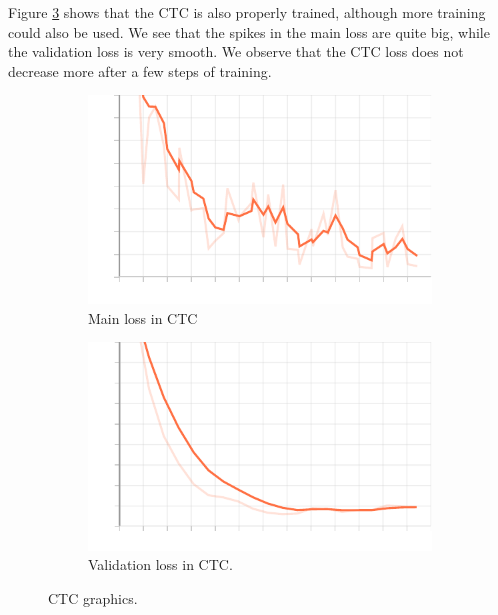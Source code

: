 \documentclass[a4paper]{article}
\begin{document}
\begin{itemize}
        Figure \ref{fig:ctc} shows that the CTC is also properly trained, although more training could also be used. We see that the spikes in the main loss are quite big, while the validation loss is very smooth. We observe that the CTC loss does not decrease more after a few steps of training.

        \begin{figure}[H]
          \centering
          \begin{subfigure}[b]{0.45\textwidth}
            \centering
            \includegraphics[width=\textwidth]{Figures/main_loss_ctc}
            \caption{Main loss in CTC}
            \label{fig:ctc:loss}
          \end{subfigure}
          \hfill
          \begin{subfigure}[b]{0.45\textwidth}
            \centering
            \includegraphics[width=\textwidth]{Figures/validation_main_loss_ctc}
            \caption{Validation loss in CTC.}
            \label{fig:validation:ctc}
          \end{subfigure}
          \caption{CTC graphics.}
          \label{fig:ctc}
        \end{figure}



\end{itemize}
\end{document}
